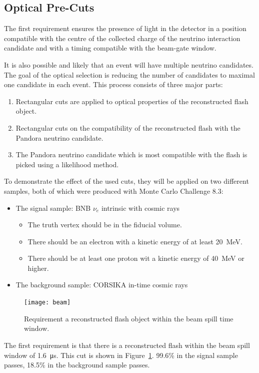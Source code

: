 \subsection{Optical Pre-Cuts}

The first requirement ensures the presence of light in the detector in a position compatible with the centre of the collected charge of the neutrino interaction candidate and with a timing compatible with the beam-gate window.

It is also possible and likely that an event will have multiple neutrino candidates. The goal of the optical selection is reducing the number of candidates to maximal one candidate in each event. This process consists of three major parts:
\begin{enumerate}
\item Rectangular cuts are applied to optical properties of the reconstructed flash object.
\item Rectangular cuts on the compatibility of the reconstructed flash with the Pandora neutrino candidate.
\item The Pandora neutrino candidate which is most compatible with the flash is picked using a likelihood method.
\end{enumerate}

To demonstrate the effect of the used cuts, they will be applied on two different samples, both of which were produced with Monte Carlo Challenge 8.3:
\begin{itemize}
\item The signal sample: BNB $\nu_e$ intrinsic with cosmic rays
\begin{itemize}
\item The truth vertex should be in the fiducial volume.
\item There should be an electron with a kinetic energy of at least \SI{20}{\MeV}.
\item There should be at least one proton wit a kinetic energy of \SI{40}{\MeV} or higher.
\end{itemize}
\item The background sample: CORSIKA in-time cosmic rays
\end{itemize}

\begin{figure}[!htbp]
\centering
\texttt{[image: beam]}
\caption{Requirement a reconstructed flash object within the beam spill time window.} 
\label{fig:beam}
\end{figure}

The first requirement is that there is a reconstructed flash within the beam spill window of \SI{1.6}{\micro\s}. This cut is shown in Figure~\ref{fig:beam}. 99.6\% in the signal sample passes, 18.5\% in the background sample passes.

